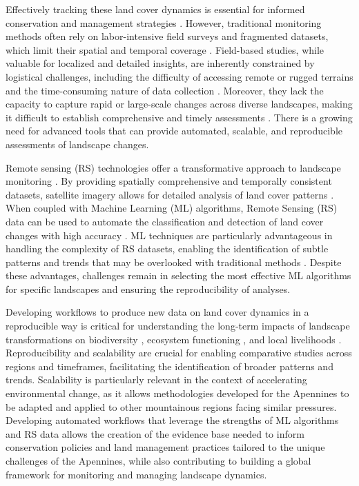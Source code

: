 \documentclass[jimaging,article,submit,pdftex,moreauthors]{Definitions/mdpi}
\begin{document}
Effectively tracking these land cover dynamics is essential for informed conservation and management strategies \cite{gutman2004land, AMICI201738}. However, traditional monitoring methods often rely on labor-intensive field surveys and fragmented datasets, which limit their spatial and temporal coverage \cite{Lelli2018,Lelli,GLASER2024108798}. Field-based studies, while valuable for localized and detailed insights, are inherently constrained by logistical challenges, including the difficulty of accessing remote or rugged terrains and the time-consuming nature of data collection \cite{Alessi}. Moreover, they lack the capacity to capture rapid or large-scale changes across diverse landscapes, making it difficult to establish comprehensive and timely assessments \cite{Knollova2024,constrmater3010008}. There is a growing need for advanced tools that can provide automated, scalable, and reproducible assessments of landscape changes.

Remote sensing (RS) technologies offer a transformative approach to landscape monitoring \cite{BALDO2023101922,ZHU2022113266,earth5030024}. By providing spatially comprehensive and temporally consistent datasets, satellite imagery allows for detailed analysis of land cover patterns \cite{ANSELMETTO2024104973,BRACCHETTI2012157,jmse12081279}. When coupled with Machine Learning (ML) algorithms, Remote Sensing (RS) data can be used to automate the classification and detection of land cover changes with high accuracy \cite{w16081141}. ML techniques are particularly advantageous in handling the complexity of RS datasets, enabling the identification of subtle patterns and trends that may be overlooked with traditional methods \cite{BAOPHAM202417,jmse12050709}. Despite these advantages, challenges remain in selecting the most effective ML algorithms for specific landscapes and ensuring the reproducibility of analyses.

Developing workflows to produce new data on land cover dynamics in a reproducible way is critical for understanding the long-term impacts of landscape transformations on biodiversity \cite{land14040828,rs17071296,rs17071304}, ecosystem functioning \cite{Jarnagin01092004}, and local livelihoods \cite{Kuemmerle_2016,Buthelezi16022024}. Reproducibility and scalability are crucial for enabling comparative studies across regions and timeframes, facilitating the identification of broader patterns and trends. Scalability is particularly relevant in the context of accelerating environmental change, as it allows methodologies developed for the Apennines to be adapted and applied to other mountainous regions facing similar pressures. Developing automated workflows that leverage the strengths of ML algorithms and RS data allows the creation of the evidence base needed to inform conservation policies and land management practices tailored to the unique challenges of the Apennines, while also contributing to building a global framework for monitoring and managing landscape dynamics.
\end{document}

